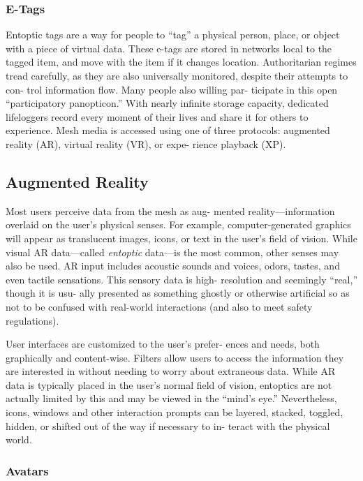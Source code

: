 \subsubsection{E-Tags}

Entoptic tags are a way for people to ``tag'' a physical 
person, place, or object with a piece of virtual data. 
These e-tags are stored in networks local to the tagged 
item, and move with the item if it changes location. 
Authoritarian regimes tread carefully, as they are also 
universally monitored, despite their attempts to con-
trol information flow. Many people also willing par-
ticipate in this open ``participatory panopticon.'' With 
nearly infinite storage capacity, dedicated lifeloggers 
record every moment of their lives and share it for 
others to experience.
Mesh media is accessed using one of three protocols: 
augmented reality (AR), virtual reality (VR), or expe-
rience playback (XP).

\subsection{Augmented Reality}

Most users perceive data from the mesh as aug-
mented reality—information overlaid on the user's 
physical senses. For example, computer-generated 
graphics will appear as translucent images, icons, 
or text in the user's field of vision. While visual AR 
data—called  \textit{entoptic} data—is the most common, 
other senses may also be used. AR input includes 
acoustic sounds and voices, odors, tastes, and 
even tactile sensations. This sensory data is high-
resolution and seemingly ``real,'' though it is usu-
ally presented as something ghostly or otherwise 
artificial so as not to be confused with real-world 
interactions (and also to meet safety regulations).

User interfaces are customized to the user's prefer-
ences and needs, both graphically and content-wise. 
Filters allow users to access the information they 
are interested in without needing to worry about 
extraneous data. While AR data is typically placed 
in the user's normal field of vision, entoptics are not 
actually limited by this and may be viewed in the 
``mind's eye.'' Nevertheless, icons, windows and other 
interaction prompts can be layered, stacked, toggled, 
hidden, or shifted out of the way if necessary to in-
teract with the physical world.

\subsubsection{Avatars}

